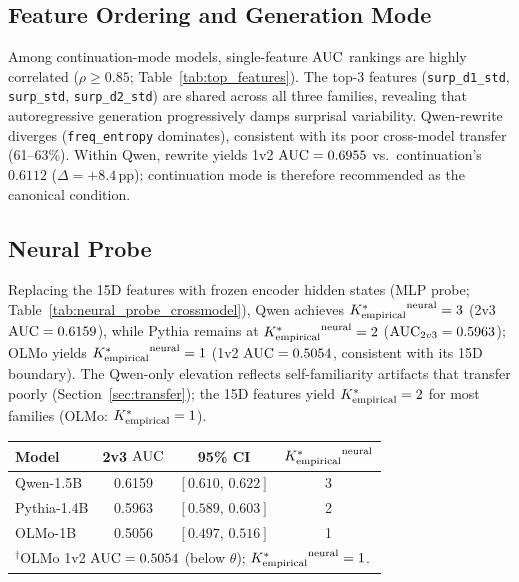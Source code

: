 \subsection{Feature Ordering and Generation Mode}
\label{sec:feature_degradation}
\label{sec:generation_mode}

Among continuation-mode models, single-feature $\text{AUC}$ rankings are highly correlated ($\rho \geq 0.85$; Table~\ref{tab:top_features}).
The top-3 features (\texttt{surp\_d1\_std}, \texttt{surp\_std}, \texttt{surp\_d2\_std}) are shared across all three families, revealing that autoregressive generation progressively damps surprisal variability.
Qwen-rewrite diverges (\texttt{freq\_entropy} dominates), consistent with its poor cross-model transfer (61--63\%).
Within Qwen, rewrite yields 1v2 $\text{AUC} = 0.6955$ vs.\ continuation's $0.6112$ ($\Delta = +8.4$\,pp); continuation mode is therefore recommended as the canonical condition.

\subsection{Neural Probe}
\label{sec:neural_probe}

Replacing the 15D features with frozen encoder hidden states (MLP probe; Table~\ref{tab:neural_probe_crossmodel}), Qwen achieves ${K^*_{\text{empirical}}}^{\text{neural}} = 3$ (2v3 $\text{AUC} = 0.6159$), while Pythia remains at ${K^*_{\text{empirical}}}^{\text{neural}} = 2$ ($\text{AUC}_{2v3} = 0.5963$); OLMo yields ${K^*_{\text{empirical}}}^{\text{neural}} = 1$ (1v2 $\text{AUC} = 0.5054$, consistent with its 15D boundary).
The Qwen-only elevation reflects self-familiarity artifacts that transfer poorly (Section~\ref{sec:transfer}); the 15D features yield ${K^*_{\text{empirical}}} = 2$ for most families (OLMo: ${K^*_{\text{empirical}}} = 1$).

\begin{minipage}{\columnwidth}
\centering
\footnotesize
{}
\label{tab:neural_probe_crossmodel}
\begin{tabular}{lccc}
\toprule
\textbf{Model} & \textbf{2v3 $\text{AUC}$} & \textbf{95\% CI} & ${K^*_{\text{empirical}}}^{\text{neural}}$ \\
\midrule
Qwen-1.5B  & 0.6159 & $[0.610,\,0.622]$ & 3 \\
Pythia-1.4B & 0.5963 & $[0.589,\,0.603]$ & 2 \\
OLMo-1B    & 0.5056 & $[0.497,\,0.516]$ & 1\rlap{$^\dagger$} \\
\bottomrule
\multicolumn{4}{l}{\footnotesize $^\dagger$OLMo 1v2 $\text{AUC} = 0.5054$ (below $\theta$); ${K^*_{\text{empirical}}}^{\text{neural}} = 1$.}
\end{tabular}
\end{minipage}

